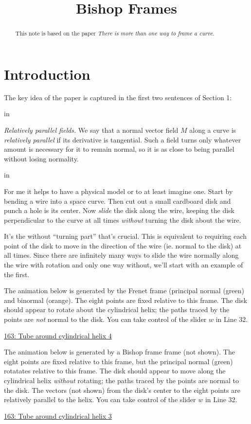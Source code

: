 \documentclass{ximera}
\title{Bishop Frames}
\newcommand{\pskip}{\vskip 0.1 in}
\begin{document}
\begin{abstract}
This note is based on the paper \emph{There is more than one way to frame a curve}.
\end{abstract}
\maketitle


\section*{Introduction}
The key idea of the paper is captured in the first two sentences of Section 1:

\pskip

\emph{Relatively parallel fields.} We say that a normal vector field $M$ along a curve is \emph{relatively parallel} if its derivative is tangential. Such a field turns only whatever amount is necessary for it to remain normal, so it is as close to being parallel without losing normality.

\pskip

For me it helps to have a physical model or to at least imagine one. Start by bending a wire into a space curve. Then cut out a small cardboard disk and punch a hole is its center. Now \emph{slide} the disk along the wire, keeping the disk perpendicular to the curve at all times \emph{without} turning the disk about the wire.

It's the without ``turning part'' that's crucial. This is equivalent to requiring each point of the disk to move in the direction of the wire (ie. normal to the disk) at all times. Since there are infinitely many ways to slide the wire normally along the wire with rotation and only one way without, we'll start with an example of the first.


\begin{exploration}
The animation below is generated by the Frenet frame (principal normal (green) and binormal (orange). The eight points are fixed relative to this frame. The disk should appear to rotate about the cylindrical helix; the paths traced by the points are \emph{not} normal to the disk. You can take control of the slider $w$ in Line 32.

\href{https://www.desmos.com/3d/vroc5lhox8}{163: Tube around cylindrical helix 4}
\end{exploration}


\begin{exploration}
The animation below is generated by a Bishop frame frame (not shown). The eight points are fixed relative to this frame, but the principal normal (green) rotatates relative to this frame. The disk should appear to move along the cylindrical helix \emph{without} rotating; the paths traced by the points are normal to the disk. The vectors (not shown) from the disk's center to the eight points are relatively parallel to the helix. You can take control of the slider $w$ in Line 32.

\href{https://www.desmos.com/3d/fg6l58x6tl}{163: Tube around cylindrical helix 3}
\end{exploration}
\end{document}
